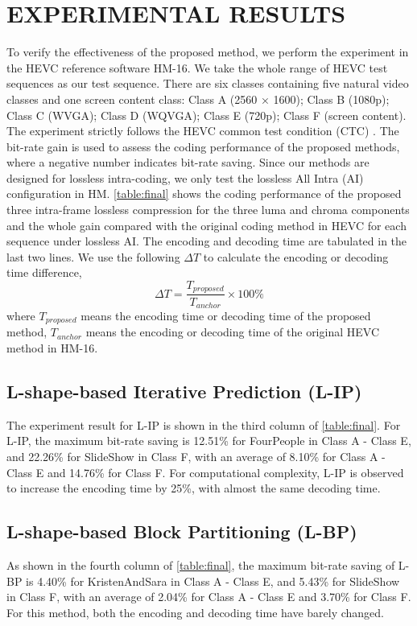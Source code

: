 \documentclass[journal]{IEEEtran}
\begin{document}
\section{EXPERIMENTAL RESULTS}
To verify the effectiveness of the proposed method, we perform the experiment in the HEVC reference software HM-16. We take the whole range of HEVC test sequences as our test sequence. There are six classes containing five natural video classes and one screen content class: Class A (2560 × 1600); Class B (1080p); Class C (WVGA); Class D (WQVGA); Class E (720p); Class F (screen content). The experiment strictly follows the HEVC common test condition (CTC) \cite{31}. The bit-rate gain is used to assess the coding performance of the proposed methods, where a negative number indicates bit-rate saving. Since our methods are designed for lossless intra-coding, we only test the lossless All Intra (AI) configuration in HM. \autoref{table:final} shows the coding performance of the proposed three intra-frame lossless compression for the three luma and chroma components and the whole gain compared with the original coding method in HEVC for each sequence under lossless AI. The encoding and decoding time are tabulated in the last two lines. We use the following $\Delta T$ to calculate the encoding or decoding time difference,
\begin{equation}
    \Delta T=\frac{T_{proposed}}{T_{anchor}} \times 100\%
\end{equation}
where $T_{proposed}$ means the encoding time or decoding time of the proposed method, $T_{anchor}$ means the encoding or decoding time of the original HEVC method in HM-16.
\subsection{L-shape-based Iterative Prediction (L-IP)}
The experiment result for L-IP is shown in the third column of \autoref{table:final}. For L-IP, the maximum bit-rate saving is 12.51\% for FourPeople in Class A - Class E, and 22.26\% for SlideShow in Class F, with an average of 8.10\% for Class A - Class E and 14.76\% for Class F. For computational complexity, L-IP is observed to increase the encoding time by 25\%, with almost the same decoding time.
 
\subsection{L-shape-based Block Partitioning (L-BP)}
As shown in the fourth column of \autoref{table:final}, the maximum bit-rate saving of L-BP is 4.40\% for KristenAndSara in Class A - Class E, and 5.43\% for SlideShow in Class F, with an average of 2.04\% for Class A - Class E and 3.70\% for Class F. For this method, both the encoding and decoding time have barely changed.
\end{document}
